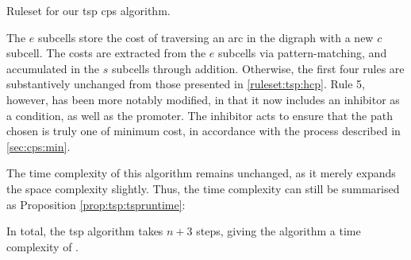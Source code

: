 \begin{cprulesetfloat}
    \begin{cpruleset}
        
        
        
        
        
        
    \end{cpruleset}
    \caption[Ruleset for the ]{\label{ruleset:tsp:tsp}Ruleset for our \gls{tsp} \gls{cps} algorithm.}
\end{cprulesetfloat}

The \(e\) subcells store the cost of traversing an arc in the digraph with a new \(c\) subcell.  The costs are extracted from the \(e\) subcells via pattern-matching, and accumulated in the \(s\) subcells through addition.  Otherwise, the first four rules are substantively unchanged from those presented in \cref{ruleset:tsp:hcp}.  Rule 5, however, has been more notably modified, in that it now includes an inhibitor as a condition, as well as the promoter.  The inhibitor acts to ensure that the path chosen is truly one of minimum cost, in accordance with the process described in \cref{sec:cps:min}.

The time complexity of this algorithm remains unchanged, as it merely expands the space complexity slightly.  Thus, the time complexity can still be summarised as Proposition \ref{prop:tsp:tspruntime}:

\begin{proposition}
In total, the \gls{tsp} algorithm takes \(n + 3\) steps, giving the algorithm a time complexity of .
\label{prop:tsp:tspruntime}
\end{proposition}